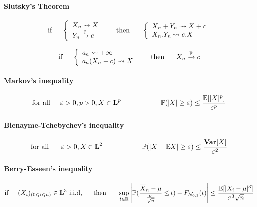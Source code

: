 \documentclass[a4paper,10pt]{article}
\begin{document}
\paragraph{Slutsky's Theorem}
\[
\text{if} \hspace{5mm} 
\left\{ 
\begin{array}{l}
X_n \rightsquigarrow X \\
Y_n \xrightarrow{\mathbb{P}} c 
\end{array}\right. 
\hspace{5mm} \text{ then  } \hspace{5mm}
\left\{ 
\begin{array}{l}
X_n + Y_n \rightsquigarrow X+c \\
X_n . Y_n \rightsquigarrow  c.X 
\end{array}\right. 
\]

\[
\text{if} \hspace{5mm} 
\left\{ 
\begin{array}{l}
a_n \rightsquigarrow +\infty \\
a_n(X_n - c) \rightsquigarrow X \\
\end{array}\right. 
\hspace{5mm} \text{ then  } \hspace{5mm} X_n \xrightarrow{\mathbb{P}} c
\]


\paragraph{Markov's inequality}
\[
\text{for all}\hspace{5mm} \varepsilon > 0, p>0, X\in \textbf{L}^p \hspace{20mm} \mathbb{P}(|X| \geq \varepsilon) \leq \frac{\mathbb{E}[|X|^p]}{\varepsilon ^p}
\]
\paragraph{Bienayme-Tchebychev's inequality}
\[
\text{for all  } \hspace{5mm} \varepsilon > 0, X\in \textbf{L}^2 \hspace{20mm} \mathbb{P}(|X- \mathbb{E}X| \geq \varepsilon) \leq \frac{\textbf{Var}[X]}{\varepsilon ^2}
\]
\paragraph{Berry-Esseen's inequality}
\[
\text{if} \hspace{5mm} (X_{i})_{(0\leqslant i \leqslant n)} \in \textbf{L}^3 \text{  i.i.d,} \hspace{5mm} \text{ then  } \hspace{5mm}
\sup_{t\in \mathbb{R}} \left| \mathbb{P}(\frac{\overline{X}_n - \mu}{\frac{\sigma}{\sqrt{n}}} \leq t) - F_{\mathcal{N}_{0,1}}(t) \right| 
\leq \frac{\mathbb{E}[|X_i - \mu|^3]}{\sigma^3 \sqrt{n}}
\]
\end{document}
